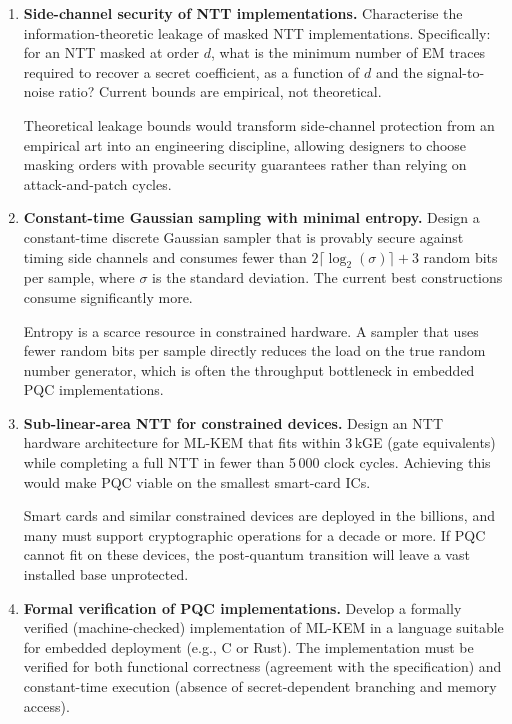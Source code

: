 \begin{enumerate}
Without these estimates, we are setting security parameters based on asymptotic analysis rather than concrete costs.  The RSA estimates revealed that Shor's algorithm requires fewer resources than previously assumed; a similar analysis for lattices could either confirm or challenge current parameter choices.

\item \textbf{Side-channel security of NTT implementations.}
Characterise the information-theoretic leakage of masked NTT implementations.  Specifically: for an NTT masked at order $d$, what is the minimum number of EM traces required to recover a secret coefficient, as a function of $d$ and the signal-to-noise ratio?  Current bounds are empirical, not theoretical.

Theoretical leakage bounds would transform side-channel protection from an empirical art into an engineering discipline, allowing designers to choose masking orders with provable security guarantees rather than relying on attack-and-patch cycles.

\item \textbf{Constant-time Gaussian sampling with minimal entropy.}
Design a constant-time discrete Gaussian sampler that is provably secure against timing side channels and consumes fewer than $2\lceil\log_2(\sigma)\rceil + 3$ random bits per sample, where $\sigma$ is the standard deviation.  The current best constructions consume significantly more.

Entropy is a scarce resource in constrained hardware.  A sampler that uses fewer random bits per sample directly reduces the load on the true random number generator, which is often the throughput bottleneck in embedded PQC implementations.

\item \textbf{Sub-linear-area NTT for constrained devices.}
Design an NTT hardware architecture for ML-KEM that fits within 3\,kGE (gate equivalents) while completing a full NTT in fewer than 5\,000 clock cycles.  Achieving this would make PQC viable on the smallest smart-card ICs.

Smart cards and similar constrained devices are deployed in the billions, and many must support cryptographic operations for a decade or more.  If PQC cannot fit on these devices, the post-quantum transition will leave a vast installed base unprotected.

\item \textbf{Formal verification of PQC implementations.}
Develop a formally verified (machine-checked) implementation of ML-KEM in a language suitable for embedded deployment (e.g., C or Rust).  The implementation must be verified for both functional correctness (agreement with the specification) and constant-time execution (absence of secret-dependent branching and memory access).


\end{enumerate}
